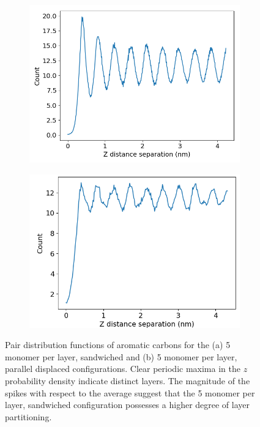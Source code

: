 \documentclass{article}
\begin{document}
  \begin{figure}[!ht]
        \centering
        \begin{subfigure}{0.45\textwidth}
                \centering
                \includegraphics[width=\textwidth]{zdf5layered.png}
                \caption{}\label{fig:zdf_layered}
        \end{subfigure}
        \begin{subfigure}{0.45\textwidth}
                \centering
                \includegraphics[width=\textwidth]{zdf5offset.png}
                \caption{}\label{fig:zdf_offset}
        \end{subfigure}
        \caption{Pair distribution functions of aromatic carbons for the
        (a) 5 monomer per layer, sandwiched and (b) 5 monomer per layer,
        parallel displaced configurations. Clear periodic maxima in the
        $z$ probability density indicate distinct layers. The magnitude
        of the spikes with respect to the average suggest that the 5
        monomer per layer, sandwiched configuration possesses a higher
        degree of layer partitioning.}\label{fig:zdf}
  \end{figure}
\end{document}
